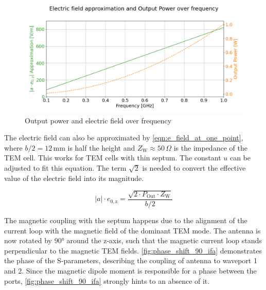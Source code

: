\begin{figure}[h]
    \centering
    \includegraphics[width=1\linewidth]{content//30_simulations//img/output_power_e_fields_over_freq_ifa.png}
    \caption{Output power and electric field over frequency}
    \label{fig:output_power_e_fields_over_freq_ifa}
\end{figure}

The electric field can also be approximated by \autoref{eqn:e_field_at_one_point}, where $b/2=12\,\mathrm{mm}$ is half the height and $Z_\mathrm{W}\approx50\,\Omega$ is the impedance of the TEM cell. This works for TEM cells with thin septum. The constant $u$ can be adjusted to fit this equation. The term $\sqrt{2}$ is needed to convert the effective value of the electric field into its magnitude.

\begin{equation}
    |a|\cdot e_{\mathrm{0,z}}=\frac{\sqrt{2\cdot P_\mathrm{Out}\cdot Z_\mathrm{W}}}{b/2}
    \label{eqn:e_field_at_one_point}
\end{equation}


The magnetic coupling with the septum happens due to the alignment of the current loop with the magnetic field of the dominant TEM mode. The antenna is now rotated by 90° around the z-axis, such that the magnetic current loop stands perpendicular to the magnetic TEM fields. \autoref{fig:phase_shift_90_ifa} demonstrates the phase of the S-parameters, describing the coupling of antenna to waveport 1 and 2. Since the magnetic dipole moment is responsible for a phase between the ports, \autoref{fig:phase_shift_90_ifa} strongly hints to an absence of it.

